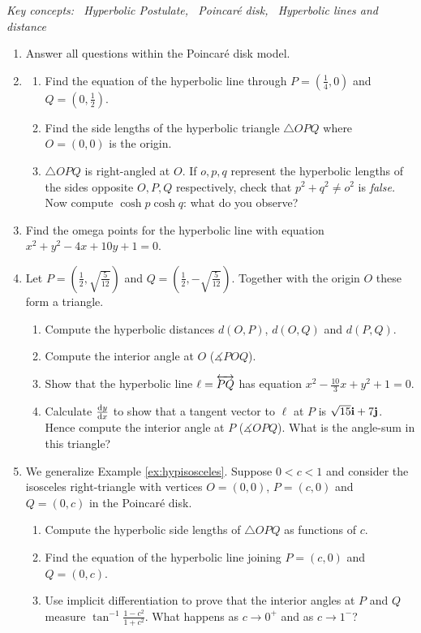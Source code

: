 \begin{exercises}
	\hangindent\leftmargini\emph{Key concepts: \ Hyperbolic Postulate, \ Poincaré disk, \ Hyperbolic lines and distance}
	
	\begin{enumerate}
	  \item[] Answer all questions within the Poincaré disk model.
	  \item\begin{enumerate}
	    \item Find the equation of the hyperbolic line through $P=(\frac 14,0)$ and $Q=(0,\frac 12)$.
	    \item Find the side lengths of the hyperbolic triangle $\triangle OPQ$ where $O=(0,0)$ is the origin.
	    \item $\triangle OPQ$ is right-angled at $O$. If $o,p,q$ represent the hyperbolic lengths of the sides opposite $O,P,Q$ respectively, check that $p^2+q^2\neq o^2$ is \emph{false.} Now compute $\cosh p\cosh q$: what do you observe?
	  \end{enumerate}
	  
	  \item Find the omega points for the hyperbolic line with equation $x^2+y^2-4x+10y+1=0$.
	  	
	  \item Let $P=\left(\frac 12,\sqrt{\frac 5{12}}\right)$ and $Q=\left(\frac 12,-\sqrt{\frac 5{12}}\right)$. Together with the origin $O$ these form a triangle.
	  \begin{enumerate}
	    \item Compute the hyperbolic distances $d(O,P)$, $d(O,Q)$ and $d(P,Q)$.
	    \item Compute the interior angle at $O$ ($\measuredangle POQ$).
		  \item Show that the hyperbolic line $\ell=\lin{PQ}$ has equation $x^2-\frac{10}3x+y^2+1=0$.
	  	\item Calculate $\diff[y]{x}$ to show that a tangent vector to $\ell$ at $P$ is $\sqrt{15}\vi+7\vj$. Hence compute the interior angle at $P$ ($\measuredangle OPQ$). What is the angle-sum in this triangle?
		\end{enumerate} 
		
	  \item\label{exs:isorighthypextended} We generalize Example \ref{ex:hypisosceles}. Suppose $0<c<1$ and consider the isosceles right-triangle with vertices $O=(0,0)$, $P=(c,0)$ and $Q=(0,c)$ in the Poincaré disk.
	  \begin{enumerate}
	    \item Compute the hyperbolic side lengths of $\triangle OPQ$ as functions of $c$.
	    \item Find the equation of the hyperbolic line joining $P=(c,0)$ and $Q=(0,c)$.
	    \item Use implicit differentiation to prove that the interior angles at $P$ and $Q$ measure $\tan^{-1}\frac{1-c^2}{1+c^2}$. What happens as $c\to 0^+$ and as $c\to 1^-$?
	  \end{enumerate}
		

\end{enumerate}
\end{exercises}
